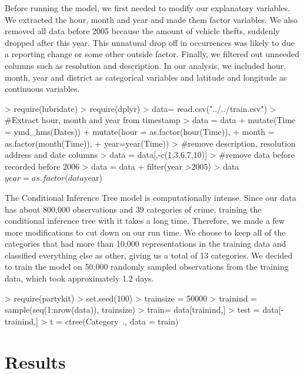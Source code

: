 \documentclass[11pt]{article}
\begin{document}
Before running the model, we first needed to modify  our explanatory variables. We extracted the hour, month and year and made them factor variables. We also removed all data before 2005 because the amount of vehicle thefts, suddenly dropped after this year. This unnatural drop off in occurrences was likely to due a reporting change or some other outside factor.  Finally, we filtered out unneeded columns such as resolution and description. In our analysis, we included hour, month, year and district as categorical variables and latitude and longitude as continuous variables. 

\begin{Schunk}
\begin{Sinput}
> require(lubridate)
> require(dplyr)
> data= read.csv("../../train.csv")
> #Extract  hour, month and year from timestamp
> data = data %
+   mutate(Time = ymd_hms(Dates)) %
+   mutate(hour = as.factor(hour(Time)), 
+          month = as.factor(month(Time)), 
+          year=year(Time))
> #remove description, resolution address and date columns
> data = data[,-c(1,3,6,7,10)]
> #remove data before recorded before 2006
> data = data %
+   filter(year >2005)
> data$year = as.factor(data$year)
\end{Sinput}
\end{Schunk}

The Conditional Inference Tree model is computationally intense. Since our data has about 800,000 observations and 39 categories of crime, training the conditional inference tree with it takes a long time. Therefore, we made a few more modifications to cut down on our run time. We choose to keep all of the categories that had more than 10,000 representations in the training data and classified everything else as other, giving us a total of 13 categories. We decided to train the model on 50,000 randomly sampled observations from the training data, which took approximately 1.2 days. 

\begin{Schunk}
\begin{Sinput}
> require(partykit)
> set.seed(100)
> trainsize = 50000
> trainind = sample(seq(1:nrow(data)), trainsize)
> train= data[trainind,]
> test = data[-trainind,]
> t = ctree(Category~., data = train)
\end{Sinput}
\end{Schunk}
  
\section*{Results}
\end{document}
